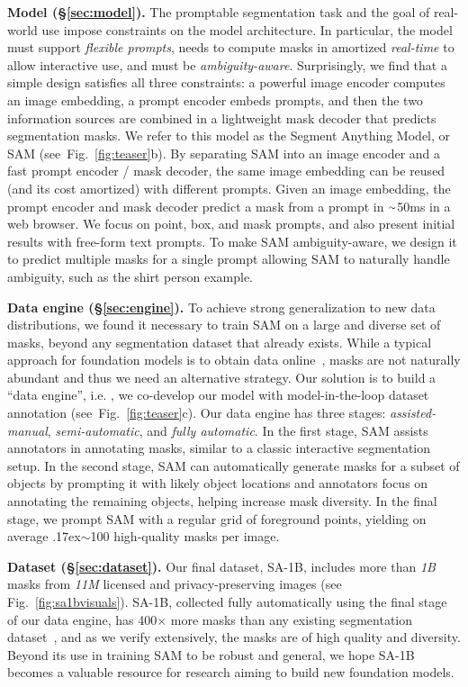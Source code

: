 \textbf{Model (\S\ref{sec:model}).} The promptable segmentation task and the goal of real-world use impose constraints on the model architecture. In particular, the model must support \emph{flexible prompts}, needs to compute masks in amortized \emph{real-time} to allow interactive use, and must be \emph{ambiguity-aware}. Surprisingly, we find that a simple design satisfies all three constraints: a powerful image encoder computes an image embedding, a prompt encoder embeds prompts, and then the two information sources are combined in a lightweight mask decoder that predicts segmentation masks. We refer to this model as the Segment Anything Model, or SAM (see~Fig.~\ref{fig:teaser}{\color{linkcolor}b}). By separating SAM into an image encoder and a fast prompt encoder / mask decoder, the same image embedding can be reused (and its cost amortized) with different prompts. Given an image embedding, the prompt encoder and mask decoder predict a mask from a prompt in $\raise.17ex\hbox{$\scriptstyle\sim$}$50ms in a web browser. We focus on point, box, and mask prompts, and also present initial results with free-form text prompts. To make SAM ambiguity-aware, we design it to predict multiple masks for a single prompt allowing SAM to naturally handle ambiguity, such as the shirt \vs person example.

\textbf{Data engine (\S\ref{sec:engine}).} To achieve strong generalization to new data distributions, we found it necessary to train SAM on a large and diverse set of masks, beyond any segmentation dataset that already exists. While a typical approach for foundation models is to obtain data online~\cite{Radford2021}, masks are not naturally abundant and thus we need an alternative strategy. Our solution is to build a ``data engine'', i.e. , we co-develop our model with model-in-the-loop dataset annotation (see~Fig.~\ref{fig:teaser}{\color{linkcolor}c}). Our data engine has three stages: \emph{assisted-manual}, \emph{semi-automatic}, and \emph{fully automatic}. In the first stage, SAM assists annotators in annotating masks, similar to a classic interactive segmentation setup. In the second stage, SAM can automatically generate masks for a subset of objects by prompting it with likely object locations and annotators focus on annotating the remaining objects, helping increase mask diversity. In the final stage, we prompt SAM with a regular grid of foreground points, yielding on average \raise.17ex\hbox{$\scriptstyle\sim$}100 high-quality masks per image.

\textbf{Dataset (\S\ref{sec:dataset}).} Our final dataset, \mbox{SA-1B}, includes more than \emph{1B} masks from \emph{11M} licensed and privacy-preserving images (see Fig.~\ref{fig:sa1bvisuals}). \mbox{SA-1B}, collected fully automatically using the final stage of our data engine, has 400${\times}$ more masks than any existing segmentation dataset~\cite{Lin2014,Gupta2019,Zhou2019,OpenImages}, and as we verify extensively, the masks are of high quality and diversity. Beyond its use in training SAM to be robust and general, we hope \mbox{SA-1B} becomes a valuable resource for research aiming to build new foundation models.

